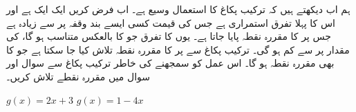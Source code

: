 ہم اب دیکھتے ہیں کہ ترکیب پکاغ کا استعمال وسیع ہے۔ اب فرض کریں  ایک ایک ہے اور اس کا پہلا تفرق استمراری ہے جس کی قیمت کسی ایسے بند وقفہ  پر  سے زیادہ ہے جس پر  کا مقررہ نقطہ پایا جاتا ہے۔ یوں  کا تفرق جو  کا بالعکس متناسب ہو گا، کی مقدار  پر  سے کم ہو گی۔ ترکیب پکاغ سے  پر  کا مقررہ نقطہ تلاش کیا جا سکتا ہے جو  کا بھی مقررہ نقطہ ہو گا۔ اس عمل کو سمجھنے کی خاطر ترکیب پکاغ سے سوال  اور سوال  میں مقررہ نقطے تلاش کریں۔

$g(x)=2x+3$
$g(x)=1-4x$
